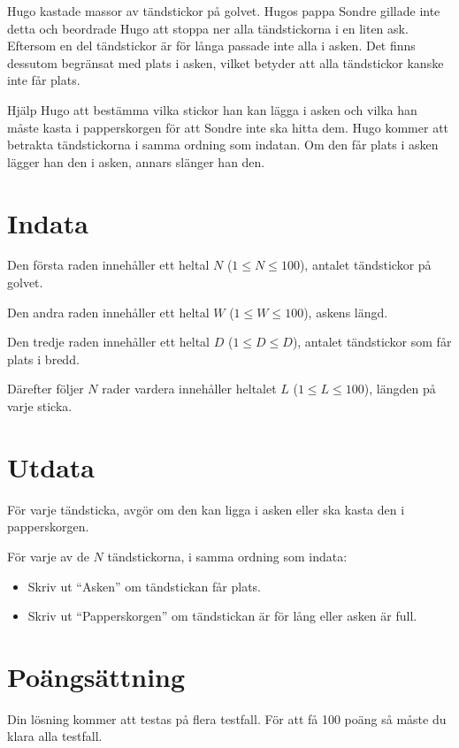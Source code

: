 Hugo kastade massor av tändstickor på golvet. Hugos pappa Sondre gillade inte detta
och beordrade Hugo att stoppa ner alla tändstickorna i en liten ask. Eftersom en del
tändstickor är för långa passade inte alla i asken. Det finns dessutom begränsat med
plats i asken, vilket betyder att alla tändstickor kanske inte får plats.

Hjälp Hugo att bestämma vilka stickor han kan lägga i asken och vilka han måste kasta
i papperskorgen för att Sondre inte ska hitta dem. Hugo kommer att betrakta tändstickorna
i samma ordning som indatan. Om den får plats i asken lägger han den i asken, annars
slänger han den.

\section*{Indata}
Den första raden innehåller ett heltal $N$ ($1 \leq N \leq 100$), antalet tändstickor på golvet.

Den andra raden innehåller ett heltal $W$ ($1 \leq W \leq 100$), askens längd.

Den tredje raden innehåller ett heltal $D$ ($1 \leq D \leq D$), antalet tändstickor som får plats i bredd.

Därefter följer $N$ rader vardera innehåller heltalet $L$ ($1 \leq L \leq 100$), längden på varje sticka.

\section*{Utdata}
För varje tändsticka, avgör om den kan ligga i asken eller ska kasta den i papperskorgen.

För varje av de $N$ tändstickorna, i samma ordning som indata:
\begin{itemize}
    \item Skriv ut ``Asken'' om tändstickan får plats.
    \item Skriv ut ``Papperskorgen'' om tändstickan är för lång eller asken är full.
\end{itemize}

\section*{Poängsättning}
Din lösning kommer att testas på flera testfall. För att få 100 poäng så måste du klara alla testfall.

